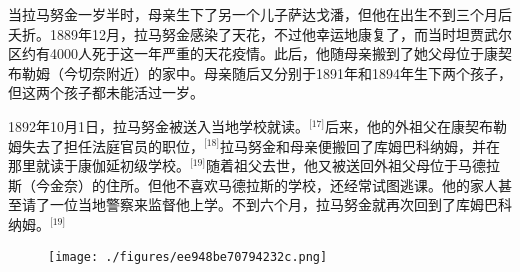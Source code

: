 当拉马努金一岁半时，母亲生下了另一个儿子萨达戈潘，但他在出生不到三个月后夭折。1889年12月，拉马努金感染了天花，不过他幸运地康复了，而当时坦贾武尔区约有4000人死于这一年严重的天花疫情。此后，他随母亲搬到了她父母位于康契布勒姆（今切奈附近）的家中。母亲随后又分别于1891年和1894年生下两个孩子，但这两个孩子都未能活过一岁。

1892年10月1日，拉马努金被送入当地学校就读。\(^\text{[17]}\)后来，他的外祖父在康契布勒姆失去了担任法庭官员的职位，\(^\text{[18]}\)拉马努金和母亲便搬回了库姆巴科纳姆，并在那里就读于康伽延初级学校。\(^\text{[19]}\)随着祖父去世，他又被送回外祖父母位于马德拉斯（今金奈）的住所。但他不喜欢马德拉斯的学校，还经常试图逃课。他的家人甚至请了一位当地警察来监督他上学。不到六个月，拉马努金就再次回到了库姆巴科纳姆。\(^\text{[19]}\)
\begin{figure}[ht]
\centering
\texttt{[image: ./figures/ee948be70794232c.png]}
\caption{} \label{fig_LMLJ_2}
\end{figure}